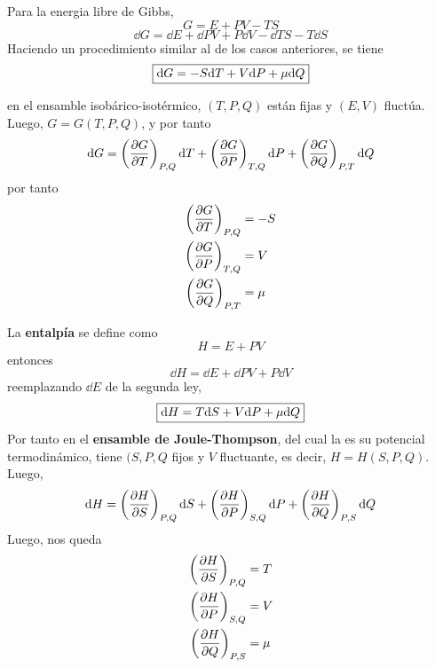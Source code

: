 Para la energia libre de Gibbs,
\begin{equation}
  G=E+PV-TS
\end{equation}
\begin{equation}
  \dd G=\dd E+\dd PV+P\dd V-\dd T S-T\dd S
\end{equation}
Haciendo un procedimiento similar al de los casos anteriores, se tiene
\begin{equation}
  \boxed{\dd G=-S\dd T+V\dd P+\mu \dd Q}
\end{equation}

en el ensamble isobárico-isotérmico, $(T,P,Q)$ están fijas y $(E,V)$ fluctúa. Luego, $G=G(T,P,Q)$, y por tanto
\begin{equation}
  \dd G=\left(\pdv{G}{T}\right)_{P,Q}\dd T+\left(\pdv{G}{P}\right)_{T,Q}\dd P+\left(\pdv{G}{Q}\right)_{P,T}\dd Q
\end{equation}
por tanto
\begin{align}
  \left(\pdv{G}{T}\right)_{P,Q}&=-S\\
  \left(\pdv{G}{P}\right)_{T,Q}&=V\\
  \left(\pdv{G}{Q}\right)_{P,T}&=\mu 
\end{align}

La \textbf{entalpía} se define como
\begin{equation}
  H=E+PV
\end{equation}
entonces 
\begin{equation}
  \dd H=\dd E+\dd PV+P\dd V
\end{equation}
reemplazando $\dd E$ de la segunda ley,
\begin{equation}
  \boxed{\dd H=T\dd S+V\dd P+\mu \dd Q}
\end{equation}
Por tanto en el \textbf{ensamble de Joule-Thompson}, del cual la es su potencial termodinámico, tiene $(S,P,Q$ fijos y $V$ fluctuante, es decir, $H=H(S,P,Q)$. Luego,
\begin{equation}
  \dd H=\left(\pdv{H}{S}\right)_{P,Q}\dd S+\left(\pdv{H}{P}\right)_{S,Q}\dd P +\left(\pdv{H}{Q}\right)_{P,S}\dd Q
\end{equation}
Luego, nos queda
\begin{align}
  \left(\pdv{H}{S}\right)_{P,Q}&=T\\
  \left(\pdv{H}{P}\right)_{S,Q}&=V\\
  \left(\pdv{H}{Q}\right)_{P,S}&=\mu 
\end{align}

